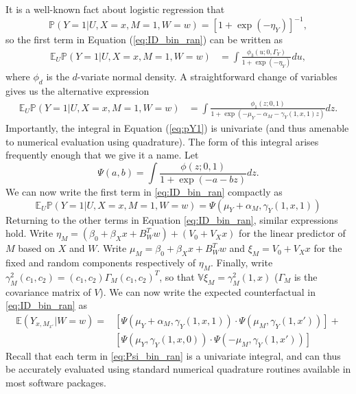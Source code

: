 \documentclass{article}
\newcommand{\bP}{\mathbb{P}}
\newcommand{\bE}{\mathbb{E}}
\newcommand{\bV}{\mathbb{V}}
\begin{document}
It is a well-known fact about logistic regression that
%
\begin{equation}
    \bP \left( Y=1 |U, X=x, M=1, W=w \right) = \left[1 + \exp(-\eta_Y)\right]^{-1},
\end{equation}
%
so the first term in Equation (\ref{eq:ID_bin_ran}) can be written as
%
\begin{align}
    \bE_U \bP \left( Y=1 |U, X=x, M=1, W=w \right) & = \int \frac{\phi_3(u; 0, \Gamma_Y)}{1 + \exp(-\eta_Y)} du, \label{eq:pY1_bad}
\end{align}
%
where $\phi_d$ is the $d$-variate normal density. A straightforward change of variables gives us the alternative expression
%
\begin{align}
    \bE_U \bP \left( Y=1 |U, X=x, M=1, W=w \right) & = \int \frac{\phi_1(z; 0, 1)}{1 + \exp(-\mu_Y - \alpha_M - \gamma_Y(1, x, 1) z)} dz. \label{eq:pY1}
\end{align}
%
Importantly, the integral in Equation (\ref{eq:pY1}) is univariate (and thus amenable to numerical evaluation using quadrature). The form of this integral arises frequently enough that we give it a name. Let
%
\begin{equation}
    \Psi(a, b) = \int \frac{\phi(z; 0, 1)}{1 + \exp(-a - b z)} dz.
\end{equation}
%
We can now write the first term in \eqref{eq:ID_bin_ran} compactly as
%
\begin{equation}
    \bE_U \bP \left( Y=1 |U, X=x, M=1, W=w \right) = \Psi(\mu_Y + \alpha_M, \gamma_Y(1, x, 1))
\end{equation}
%
Returning to the other terms in Equation \eqref{eq:ID_bin_ran}, similar expressions hold. Write $\eta_M = (\beta_0 + \beta_X x + B_W^T w) + (V_0 + V_X x)$ for the linear predictor of $M$ based on $X$ and $W$. Write $\mu_M = \beta_0 + \beta_X x + B_W^T w$ and $\xi_M = V_0 + V_X x$ for the fixed and random components respectively of $\eta_M$. Finally, write $\gamma^2_M(c_1, c_2) = (c_1, c_2) \Gamma_M (c_1, c_2)^T$, so that $\bV \xi_M = \gamma^2_M(1, x)$ ($\Gamma_M$ is the covariance matrix of $V$). We can now write the expected counterfactual in \eqref{eq:ID_bin_ran} as
%
\begin{align}
    \bE (Y_{x, M_{x'}} | W=w) = & \left[  \Psi(\mu_Y + \alpha_M, \gamma_Y(1, x, 1)) \cdot \Psi(\mu_M , \gamma_Y(1, x')) \right] + \label{eq:Psi_bin_ran}\\
    & \left[ \Psi(\mu_Y, \gamma_Y(1, x, 0)) \cdot \Psi(- \mu_M , \gamma_Y(1, x')) \right] \nonumber
\end{align}
%
Recall that each term in \eqref{eq:Psi_bin_ran} is a univariate integral, and can thus be accurately evaluated using standard numerical quadrature routines available in most software packages.
\end{document}
